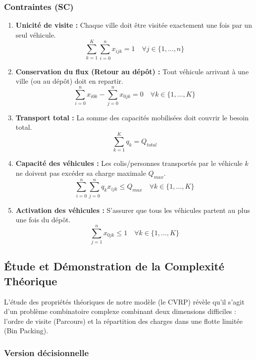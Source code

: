 \subsubsection*{Contraintes (SC)}
{}

\begin{enumerate}
    \item \textbf{Unicité de visite :} Chaque ville doit être visitée exactement une fois par un seul véhicule.
    $$\sum_{k=1}^{K} \sum_{i=0}^{n} x_{ijk} = 1 \quad \forall j \in \{1, \dots, n\}$$

    \item \textbf{Conservation du flux (Retour au dépôt) :} Tout véhicule arrivant à une ville (ou au dépôt) doit en repartir.
    $$\sum_{i=0}^{n} x_{i0k} - \sum_{j=0}^{n} x_{0jk} = 0 \quad \forall k \in \{1, \dots, K\}$$

    \item \textbf{Transport total :} La somme des capacités mobilisées doit couvrir le besoin total.
    $$\sum_{k=1}^{K} q_k = Q_{total}$$

    \item \textbf{Capacité des véhicules :} Les colis/personnes transportés par le véhicule $k$ ne doivent pas excéder sa charge maximale $Q_{max}$.
    $$\sum_{i=0}^{n} \sum_{j=0}^{n} q_k x_{ijk} \leq Q_{max} \quad \forall k \in \{1, \dots, K\}$$

    \item \textbf{Activation des véhicules :} S'assurer que tous les véhicules partent au plus une fois du dépôt.
    $$\sum_{j=1}^{n} x_{0jk} \leq 1 \quad \forall k \in \{1, \dots, K\}$$
\end{enumerate}

\subsection*{Étude et Démonstration de la Complexité Théorique}
{}

L'étude des propriétés théoriques de notre modèle (le CVRP) révèle qu'il s'agit d'un problème combinatoire complexe combinant deux dimensions difficiles : l'ordre de visite (Parcours) et la répartition des charges dans une flotte limitée (Bin Packing).

\subsubsection*{Version décisionnelle}
{}

